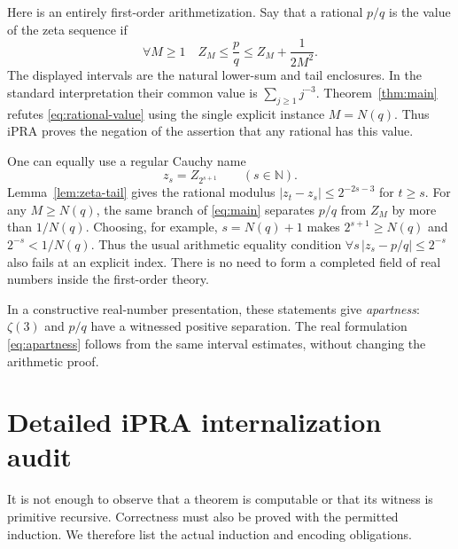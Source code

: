 \documentclass[11pt]{article}
\theoremstyle{definition}\newtheorem{definition}[theorem]{Definition}
\theoremstyle{remark}\newtheorem{remark}[theorem]{Remark}
\newcommand{\N}{\mathbb N}\newcommand{\Z}{\mathbb Z}\newcommand{\Q}{\mathbb Q}
\newcommand{\abs}[1]{\left|#1\right|}\newcommand{\floor}[1]{\left\lfloor#1\right\rfloor}
\begin{document}
Here is an entirely first-order arithmetization. Say that a rational $p/q$
is the value of the zeta sequence if
\begin{equation}\label{eq:rational-value}
 \forall M\ge1\quad
 Z_M\le\frac pq\le Z_M+\frac1{2M^2}.
\end{equation}
The displayed intervals are the natural lower-sum and tail enclosures.
In the standard interpretation their common value is $\sum_{j\ge1}j^{-3}$.
Theorem~\ref{thm:main} refutes \eqref{eq:rational-value} using the single
explicit instance $M=N(q)$. Thus iPRA proves the negation of the assertion
that any rational has this value.

One can equally use a regular Cauchy name
\[
 z_s=Z_{2^{s+1}}\qquad(s\in\N).
\]
Lemma~\ref{lem:zeta-tail} gives the rational modulus
$\abs{z_t-z_s}\le2^{-2s-3}$ for $t\ge s$.
For any $M\ge N(q)$, the same branch of \eqref{eq:main} separates $p/q$
from $Z_M$ by more than $1/N(q)$. Choosing, for example, $s=N(q)+1$ makes
$2^{s+1}\ge N(q)$ and $2^{-s}<1/N(q)$. Thus the usual arithmetic equality
condition $\forall s\,\abs{z_s-p/q}\le2^{-s}$ also fails at an explicit
index. There is no need to form a completed field of real numbers inside
the first-order theory.

In a constructive real-number presentation, these statements give
\emph{apartness}: $\zeta(3)$ and $p/q$ have a witnessed positive separation.
The real formulation \eqref{eq:apartness} follows from the same interval
estimates, without changing the arithmetic proof.

\section{Detailed iPRA internalization audit}\label{sec:audit}
It is not enough to observe that a theorem is computable or that its witness
is primitive recursive. Correctness must also be proved with the permitted
induction. We therefore list the actual induction and encoding obligations.
\end{document}
